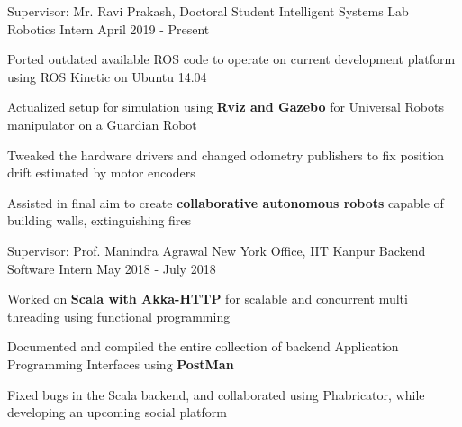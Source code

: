 \begin{cventries}

  \cventry
    {Supervisor: Mr. Ravi Prakash, Doctoral Student}
    {Intelligent Systems Lab}
    {Robotics Intern}
    {April 2019 - Present}
    {
      \begin{cvitems}
        \item{Ported outdated available ROS code to operate on current development platform using ROS Kinetic on Ubuntu 14.04}
        \item{Actualized setup for simulation using \textbf{Rviz and Gazebo} for Universal Robots manipulator on a Guardian Robot}
        \item{Tweaked the hardware drivers and changed odometry publishers to fix position drift estimated by motor encoders}
        \item{Assisted in final aim to create \textbf{collaborative autonomous robots} capable of building walls, extinguishing fires}
      \end{cvitems}
    }  

  \cventry
    {Supervisor: Prof. Manindra Agrawal}
    {New York Office, IIT Kanpur}
    {Backend Software Intern}
    {May 2018 - July 2018}
    {
      \begin{cvitems}
        \item{Worked on \textbf{Scala with Akka-HTTP} for scalable and concurrent multi threading using functional programming}
        \item{Documented and compiled the entire collection of backend Application Programming Interfaces using \textbf{PostMan}}
        \item{Fixed bugs in the Scala backend, and collaborated using Phabricator, while developing an upcoming social platform}
      \end{cvitems}
    }

\end{cventries}

